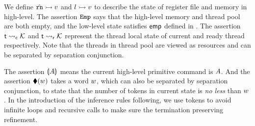 We define ${\hat{\texttt{rn}}} \rightarrowtail {v}$ and ${l} \rightarrowtail {v}$
to describe the state of
register file and memory in high-level.
The assertion $\texttt{Emp}$
says that the high-level memory and thread pool are
both empty, and the low-level state satisfies $\textsf{emp}$
defined in \Fig{\ref{fig:Semantics of Assertions}}.
The assertion ${\textsf{t}} \leadsto_{\textsf{c}} {\mathcal{K}}$
and ${\textsf{t}} \leadsto_{\textsf{r}} {\mathcal{K}}$ represent
the thread local state of current and ready
thread respectively. Note that the threads in thread pool
are viewed as resources and can be separated by
separation conjunction.

The assertion $\llparenthesis {\textit{A}} \rrparenthesis$ means the
current high-level primitive command is $\textit{A}$.
And the assertion $\blacklozenge({w})$ takes a word $w$,
which can also be separated by separation conjunction,
to state that the number of tokens in current state is
\textit{no less} than $w$. In the
introduction of the inference rules following, we use tokens
to avoid infinite loops and recursive calls to make sure
the termination preserving refinement.

